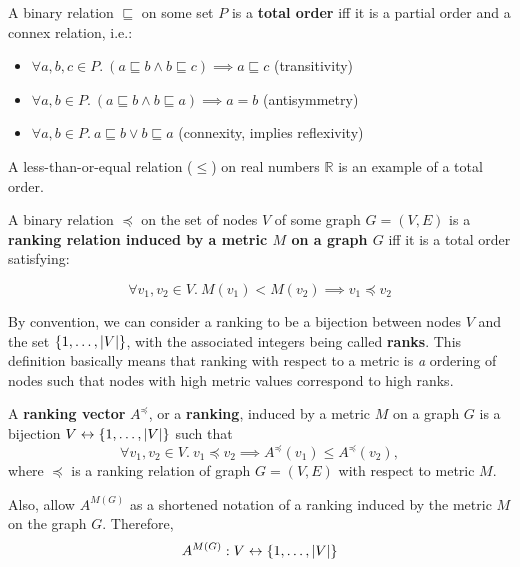 \begin{definition}
    A binary relation $\sqsubseteq$ on some set $P$ is a \textbf{total order} iff it is a partial order and a connex relation, i.e.:
    \begin{itemize}
        \item $\forall a, b, c \in P.\ (a \sqsubseteq b \wedge b \sqsubseteq c) \implies a \sqsubseteq c$ \tabto{7.3cm}(transitivity)
        \item $\forall a, b \in P.\ (a \sqsubseteq b \wedge b \sqsubseteq a) \implies a = b$ \tabto{7.3cm}(antisymmetry)
        \item $\forall a, b \in P.\ a \sqsubseteq b \vee b \sqsubseteq a$ \tabto{7.3cm}(connexity, implies reflexivity)
    \end{itemize}
\end{definition}

A less-than-or-equal relation ($\leq$) on real numbers $\mathbb{R}$ is an example of a total order.

\begin{definition}
    A binary relation $\preceq$ on the set of nodes $V$ of some graph $G = (V, E)$ is a \textbf{ranking relation induced by a metric $M$ on a graph $G$} iff it is a total order satisfying:

    \[ \forall v_1, v_2 \in V.\ M(v_1) < M(v_2) \implies v_1 \preceq v_2 \]
\end{definition}

By convention, we can consider a ranking to be a bijection between nodes $V$ and the set $\left\{1, \dots, \left\lvert V \right\rvert\right\}$, with the associated integers being called \textbf{ranks}.
This definition basically means that ranking with respect to a metric is \textsl{a} ordering of nodes such that nodes with high metric values correspond to high ranks.

\begin{definition}
    A \textbf{ranking vector} $A^{\preceq}$, or a \textbf{ranking}, induced by a metric $M$ on a graph $G$ is a bijection $V \leftrightarrow \left\{1, \dots, \left\lvert V \right\rvert\right\}$ such that
    \[ \forall v_1, v_2 \in V.\ v_1 \preceq v_2 \implies A^{\preceq}(v_1) \leq A^{\preceq}(v_2), \]
    where $\preceq$ is a ranking relation of graph $G = (V, E)$ with respect to metric $M$.

    Also, allow $A^{M(G)}$ as a shortened notation of a ranking induced by the metric $M$ on the graph $G$.
    Therefore,
    \[ A^{M(G)} : V \leftrightarrow \left\{1, \dots, \left\lvert V \right\rvert\right\} \]
\end{definition}

